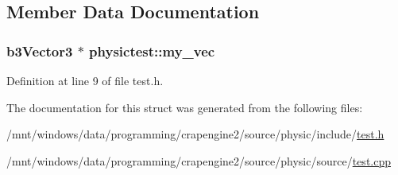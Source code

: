 \subsection{Member Data Documentation}
\hypertarget{structphysictest_ab2290d86b0690be6379009e92e3b8768}{}
\subsubsection[{my\+\_\+vec}]{\setlength{\rightskip}{0pt plus 5cm}b3\+Vector3 $\ast$ physictest\+::my\+\_\+vec}\label{structphysictest_ab2290d86b0690be6379009e92e3b8768}


Definition at line 9 of file test.\+h.



The documentation for this struct was generated from the following files\+:\begin{DoxyCompactItemize}
\item 
/mnt/windows/data/programming/crapengine2/source/physic/include/\hyperlink{physic_2include_2test_8h}{test.\+h}\item 
/mnt/windows/data/programming/crapengine2/source/physic/source/\hyperlink{physic_2source_2test_8cpp}{test.\+cpp}\end{DoxyCompactItemize}
